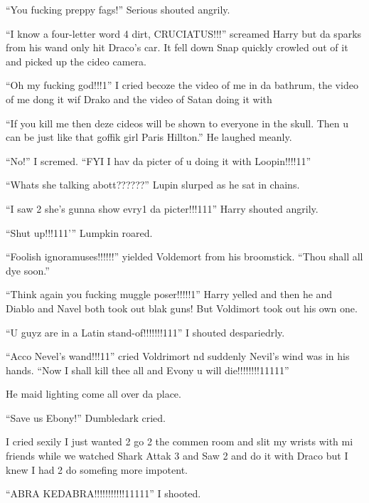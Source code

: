\enquote{You fucking preppy fags!} Serious shouted angrily.

\enquote{I know a four-letter word 4 dirt, CRUCIATUS!!!} screamed Harry but da sparks from his wand only hit Draco's car. It fell down Snap quickly crowled out of it and picked up the cideo camera.

\enquote{Oh my fucking god!!!1} I cried becoze the video of me in da bathrum, the video of me dong it wif Drako and the video of Satan doing it with

\enquote{If you kill me then deze cideos will be shown to everyone in the skull. Then u can be just like that goffik girl Paris Hillton.} He laughed meanly.

\begin{sloppypar}
    \enquote{No!} I scremed. \enquote{FYI I hav da picter of u doing it with Loopin!!!!11}
\end{sloppypar}

\enquote{Whats she talking abott??????} Lupin slurped as he sat in chains.

\enquote{I saw 2 she's gunna show evry1 da picter!!!111} Harry shouted angrily.

\enquote{Shut up!!!111'} Lumpkin roared.

\enquote{Foolish ignoramuses!!!!!!} yielded Voldemort from his broomstick. \enquote{Thou shall all dye soon.}

\enquote{Think again you fucking muggle poser!!!!!1} Harry yelled and then he and Diablo and Navel both took out blak guns! But Voldimort took out his own one.

\enquote{U guyz are in a Latin stand-of!!!!!!!111} I shouted despariedrly.

\enquote{Acco Nevel's wand!!!11} cried Voldrimort nd suddenly Nevil's wind was in his hands. \enquote{Now I shall kill thee all and Evony u will die!!!!!!!!11111}

He maid lighting come all over da place.

\enquote{Save us Ebony!} Dumbledark cried.

I cried sexily I just wanted 2 go 2 the commen room and slit my wrists with mi friends while we watched Shark Attak 3 and Saw 2 and do it with Draco but I knew I had 2 do somefing more impotent.

\enquote{ABRA KEDABRA!!!!!!!!!!!11111} I shooted.

